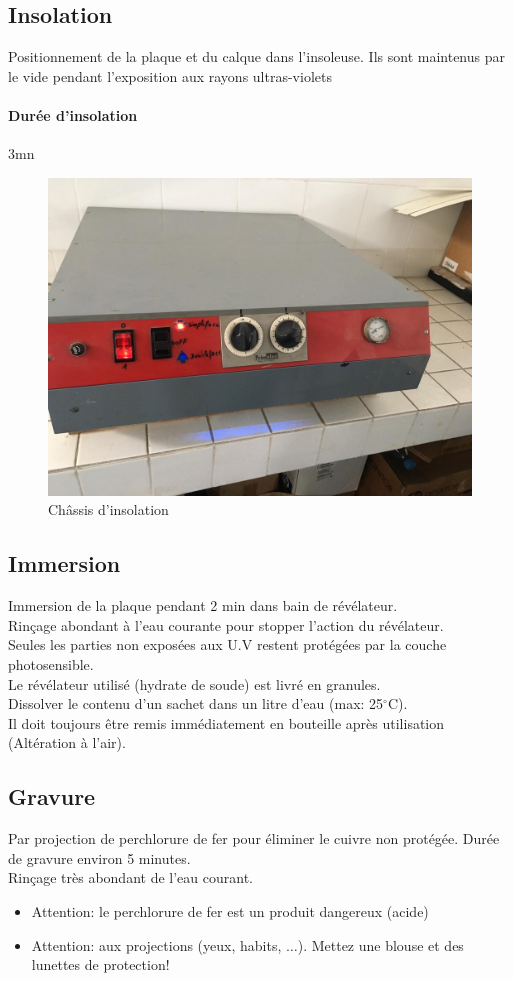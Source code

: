 \subsection{Insolation}
Positionnement de la plaque et du calque dans l'insoleuse. Ils sont maintenus par le vide pendant l'exposition aux rayons ultras-violets
\paragraph*{Durée d'insolation} 3mn

\begin{figure}[!htbp]
    \centering
    \includegraphics[width=.7\linewidth]{assets/realisation/x4.jpeg}
    \caption{Châssis d'insolation}
\end{figure}

\FloatBarrier

\subsection{Immersion}
Immersion de la plaque pendant 2 min dans bain de révélateur. \\
Rinçage abondant à l'eau courante pour stopper l'action du révélateur. \\
Seules les parties non exposées aux U.V restent protégées par la couche photosensible. \\
Le révélateur utilisé (hydrate de soude) est livré en granules. \\
Dissolver le contenu d'un sachet dans un litre d'eau (max: 25$^{\circ}$C). \\
Il doit toujours être remis immédiatement en bouteille après utilisation (Altération à l'air).

\subsection{Gravure}
Par projection de perchlorure de fer pour éliminer le cuivre non protégée.
Durée de gravure environ 5 minutes. \\
Rinçage très abondant de l'eau courant.
\begin{itemize}
    \item {\color{red} Attention:} le perchlorure de fer est un produit dangereux (acide)
    \item {\color{red} Attention:} aux projections (yeux, habits, $\hdots$). Mettez une blouse et des lunettes de protection!
\end{itemize}

